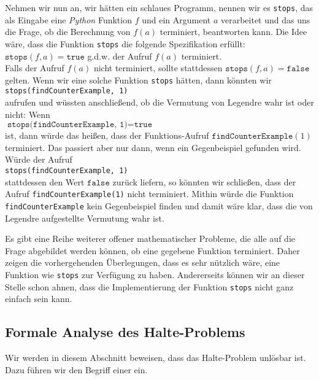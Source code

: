 Nehmen wir nun an, wir hätten ein schlaues Programm, nennen wir es \texttt{stops}, das als Eingabe
eine \textsl{Python} Funktion $f$ und ein Argument $a$ verarbeitet und das uns die Frage, ob die Berechnung von $f(a)$
terminiert, beantworten kann.  Die Idee wäre, dass die Funktion \texttt{stops} die folgende Spezifikation erfüllt:
\\[0.2cm]
\hspace*{1.3cm}
$\texttt{stops}(f, a) = \texttt{true}$ \quad g.d.w. \quad der Aufruf $f(a)$ terminiert.
\\[0.2cm]
Falls der Aufruf $f(a)$ nicht terminiert,  sollte stattdessen $\texttt{stops}(f,a) = \texttt{false}$ gelten.
Wenn wir eine solche Funktion \texttt{stops} hätten, dann könnten wir 
\\[0.2cm]
\hspace*{1.3cm}
\texttt{stops(findCounterExample, 1)}
\\[0.2cm]
aufrufen und wüssten anschließend, ob die Vermutung von Legendre wahr ist oder nicht:  Wenn
\\[0.2cm]
\hspace*{1.3cm}
$\texttt{stops(findCounterExample, 1)} = \texttt{true}$
 \\[0.2cm]
ist, dann würde das heißen,
dass der Funktions-Aufruf $\texttt{findCounterExample}(1)$ terminiert.  Das passiert aber nur dann,
wenn ein Gegenbeispiel gefunden wird.  Würde der Aufruf 
\\[0.2cm]
\hspace*{1.3cm}
\texttt{stops(findCounterExample, 1)}
\\[0.2cm]
stattdessen den Wert  $\texttt{false}$ zurück liefern, so könnten wir schließen, dass der Aufruf \texttt{findCounterExample(1)}
nicht terminiert. Mithin würde die Funktion \texttt{findCounterExample} kein Gegenbeispiel finden und
damit wäre klar, dass die von Legendre aufgestellte Vermutung wahr ist.

Es gibt eine Reihe weiterer offener  mathematischer Probleme, die alle auf die Frage abgebildet
werden können, ob eine gegebene Funktion terminiert.  Daher zeigen die vorhergehenden Überlegungen,
dass es sehr nützlich wäre, eine Funktion wie \texttt{stops} zur Verfügung zu haben.  Andererseits
können wir an dieser Stelle schon ahnen, dass die Implementierung der Funktion \texttt{stops}
nicht ganz einfach sein kann.  

 
\subsection{Formale Analyse des Halte-Problems}
Wir werden in diesem Abschnitt beweisen, dass das Halte-Problem unlösbar ist.  Dazu führen
wir den Begriff einer  ein.  

